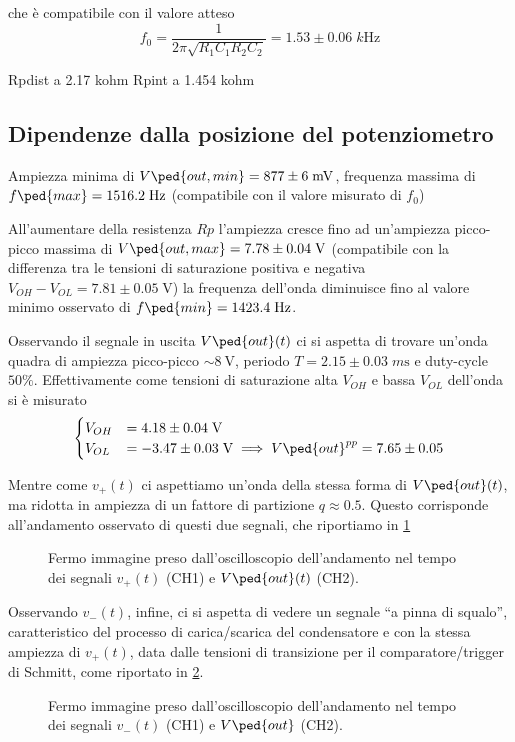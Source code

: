 \documentclass[10pt, a4paper, italian]{article}
\begin{document}
che è compatibile con il valore atteso
\begin{equation}
f_0 =\frac{1}{2 \pi \sqrt{R_1 C_1 R_2 C_2}} = 1.53 \pm 0.06 \; \si{k\Hz}
\end{equation}

Rpdist a 2.17 kohm
Rpint a 1.454 kohm

\subsection{Dipendenze dalla posizione del potenziometro}
Ampiezza minima di $V\ped{out, min} = 877 \pm 6 \; \si{m\V}$, frequenza massima di
$f\ped{max} = 1516.2 \; \si{\Hz}$ (compatibile con il valore misurato di $f_0$)

All'aumentare della resistenza $Rp$ l'ampiezza cresce fino ad un'ampiezza
picco-picco massima di $V\ped{out, max} = 7.78 \pm 0.04 \; \si{\V}$
(compatibile con la differenza tra le tensioni di saturazione positiva e
negativa $V_{OH} - V_{OL} = 7.81 \pm 0.05 \; \si{\V}$)
la frequenza dell'onda diminuisce fino al valore minimo osservato di
$f\ped{min} = 1423.4 \; \si{\Hz}$.

Osservando il segnale in uscita $V\ped{out} (t)$ ci si aspetta di trovare
un'onda quadra di ampiezza picco-picco $\sim \SI{8}{\V}$, periodo
$T = 2.15 \pm 0.03 \; \si{m\s}$ e duty-cycle $50 \%$. Effettivamente come
tensioni di saturazione alta $V_{OH}$ e bassa $V_{OL}$ dell'onda si è misurato
\begin{align*}
\begin{cases}
V_{OH} &= 4.18 \pm 0.04 \; \si{\V} \\
V_{OL} &= -3.47 \pm 0.03 \; \si{\V}  \implies V\ped{out}^{pp} = 7.65 \pm 0.05
\end{cases}
\end{align*}

Mentre come $v_+ (t)$ ci aspettiamo un'onda della stessa forma di
$V\ped{out} (t)$, ma ridotta in ampiezza di un fattore di partizione
$q \approx 0.5$. Questo corrisponde all'andamento osservato di questi due
segnali, che riportiamo in \cref{fig: v+vout}
\begin{figure}[htbp]
	\centering
	\caption{Fermo immagine preso dall'oscilloscopio dell'andamento nel tempo dei
	segnali $v_+ (t)$ (CH1) e $V\ped{out} (t)$ (CH2). \label{fig: v+vout}}
\end{figure}

Osservando $v_- (t)$, infine, ci si aspetta di vedere un segnale ``a pinna di
squalo'', caratteristico del processo di carica/scarica del condensatore e
con la stessa ampiezza di $v_+ (t)$, data dalle tensioni di transizione per
il comparatore/trigger di Schmitt, come riportato in \cref{fig: v-vout}.
\begin{figure}[htbp]
	\centering
	\caption{Fermo immagine preso dall'oscilloscopio dell'andamento nel tempo dei
	segnali $v_- (t)$ (CH1) e $V\ped{out}$ (CH2). \label{fig: v-vout}}
\end{figure}
\end{document}
